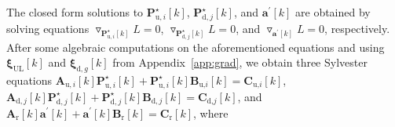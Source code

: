 \documentclass[10pt,journal]{IEEEtran}
\newcommand{\paren}[1]{\left({#1}\right)}
\newcommand{\bracket}[1]{{\left [{#1}\right ]}}
\theoremstyle{definition}
\begin{document}
The closed form solutions to  $\mathbf{P}^\star_{\textrm{u},i}\bracket{k}$, $\mathbf{P}^\star_{\textrm{d},j}\bracket{k}$, and $\mathbf{a}^\prime\bracket{k}$ are obtained by solving equations $\triangledown_{\mathbf{P}^\star_{\textrm{u},i}\bracket{k}}L=0$, $\triangledown_{\mathbf{P}^\star_{\textrm{d},j}\bracket{k}}L=0$, and $\triangledown_{\mathbf{a}^\prime\bracket{k}}L=0$, respectively.
After some algebraic computations on the aforementioned equations and using $\boldsymbol{\xi}_{\textrm{UL}}\bracket{k}$ and  $\boldsymbol{\xi}_{\textrm{d},g}\bracket{k}$ from Appendix~\ref{app:grad}, we obtain three Sylvester equations $\mathbf{A}_{\textrm{u},i}\bracket{k}\mathbf{P}^\star_{\textrm{u},i}\bracket{k}+\mathbf{P}^\star_{\textrm{u},i}\bracket{k}\mathbf{B}_{\textrm{u,}i}\bracket{k}=\mathbf{C}_{\textrm{u,}i}\bracket{k}$, $\mathbf{A}_{\textrm{d},j}\bracket{k}\mathbf{P}^\star_{\textrm{d},j}\bracket{k}+\mathbf{P}^\star_{\textrm{d},j}\bracket{k}\mathbf{B}_{\textrm{d},j}\bracket{k}=\mathbf{C}_{\textrm{d,}j}\bracket{k}$, and $\mathbf{A}_{\textrm{r}}\bracket{k}\mathbf{a}^\prime\bracket{k}+\mathbf{a}^\prime\bracket{k}\mathbf{B}_{\textrm{r}}\bracket{k}=\mathbf{C}_{\textrm{r}}\bracket{k}$, where \par\indent\small
\end{document}
